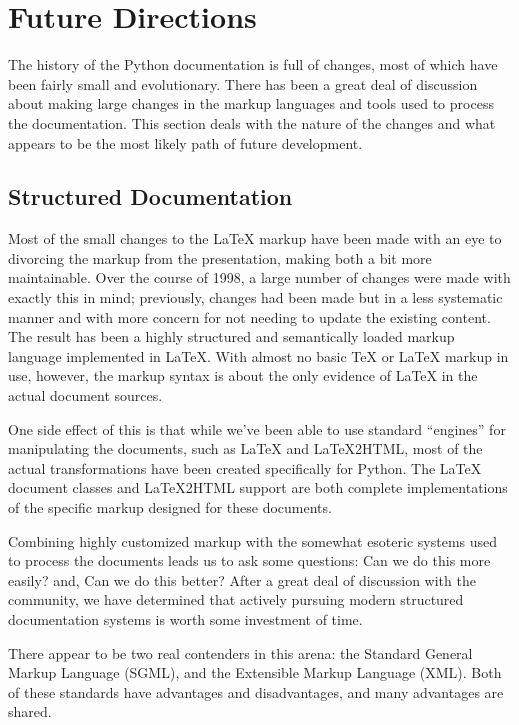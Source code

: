 \documentclass{howto}
\begin{document}
\section{Future Directions \label{futures}}

  The history of the Python documentation is full of changes, most of
  which have been fairly small and evolutionary.  There has been a
  great deal of discussion about making large changes in the markup
  languages and tools used to process the documentation.  This section
  deals with the nature of the changes and what appears to be the most
  likely path of future development.

  \subsection{Structured Documentation \label{structured}}

    Most of the small changes to the \LaTeX{} markup have been made
    with an eye to divorcing the markup from the presentation, making
    both a bit more maintainable.  Over the course of 1998, a large
    number of changes were made with exactly this in mind; previously,
    changes had been made but in a less systematic manner and with
    more concern for not needing to update the existing content.  The
    result has been a highly structured and semantically loaded markup
    language implemented in \LaTeX.  With almost no basic \TeX{} or
    \LaTeX{} markup in use, however, the markup syntax is about the
    only evidence of \LaTeX{} in the actual document sources.

    One side effect of this is that while we've been able to use
    standard ``engines'' for manipulating the documents, such as
    \LaTeX{} and \LaTeX2HTML, most of the actual transformations have
    been created specifically for Python.  The \LaTeX{} document
    classes and \LaTeX2HTML support are both complete implementations
    of the specific markup designed for these documents.

    Combining highly customized markup with the somewhat esoteric
    systems used to process the documents leads us to ask some
    questions:  Can we do this more easily?  and, Can we do this
    better?  After a great deal of discussion with the community, we
    have determined that actively pursuing modern structured
    documentation systems is worth some investment of time.

    There appear to be two real contenders in this arena: the Standard
    General Markup Language (SGML), and the Extensible Markup Language
    (XML).  Both of these standards have advantages and disadvantages,
    and many advantages are shared.
\end{document}

